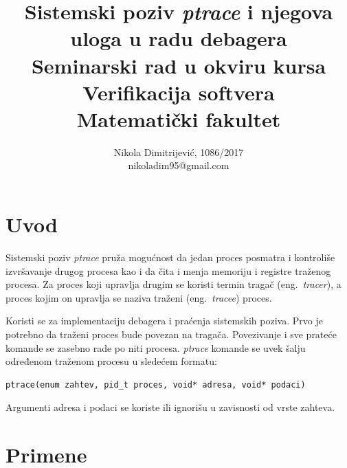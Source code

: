 \documentclass[a4paper]{article}
\begin{document}
\title{Sistemski poziv \emph{ptrace} i njegova uloga u radu debagera\\ \small{Seminarski rad u okviru kursa\\Verifikacija softvera\\ Matematički fakultet}}

\author{Nikola Dimitrijević, 1086/2017\\ nikoladim95@gmail.com}
\maketitle

    
\tableofcontents

\newpage
\section{Uvod}
\label{sec:uvod}
Sistemski poziv \emph{ptrace} pruža mogućnost da jedan proces posmatra
i kontroliše izvršavanje drugog procesa kao i da čita i menja
memoriju i registre traženog procesa. Za proces koji upravlja drugim se koristi termin tragač (eng.~{\em tracer}), a
proces kojim on upravlja se naziva traženi  (eng.~{\em tracee}) proces.

Koristi se za implementaciju debagera i praćenja sistemskih poziva.
Prvo je potrebno da traženi proces bude povezan na tragača. Povezivanje i sve prateće komande se
zasebno rade po niti procesa. \emph{ptrace} komande se uvek šalju određenom traženom procesu u sledećem formatu:

\begin{verbatim}
ptrace(enum zahtev, pid_t proces, void* adresa, void* podaci)
\end{verbatim}

Argumenti adresa i podaci se koriste ili ignorišu u zavisnosti od vrste zahteva.
\section{Primene}
\end{document}
